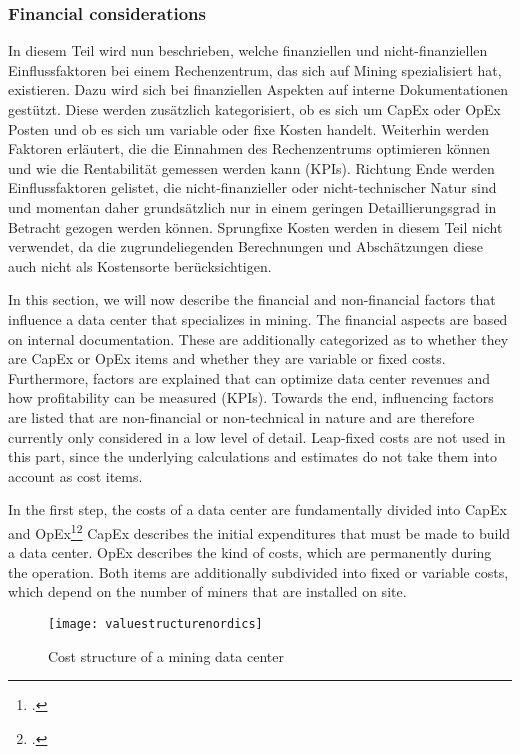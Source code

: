 \subsubsection{Financial considerations} \label{toc:kennzahlenundeinflussfaktoren}

In diesem Teil wird nun beschrieben, welche finanziellen und nicht-finanziellen Einflussfaktoren bei einem
Rechenzentrum, das sich auf Mining spezialisiert hat, existieren. Dazu wird sich bei finanziellen Aspekten auf interne
Dokumentationen gestützt. Diese werden zusätzlich kategorisiert, ob es sich um \ac{CapEx} oder \ac{OpEx} Posten und
ob es sich um variable oder fixe Kosten handelt. Weiterhin werden Faktoren erläutert, die die Einnahmen des Rechenzentrums
optimieren können und wie die Rentabilität gemessen werden kann (\acp{KPI}). Richtung Ende werden Einflussfaktoren
gelistet, die nicht-finanzieller oder nicht-technischer Natur sind und momentan daher grundsätzlich nur in einem geringen
Detaillierungsgrad in Betracht gezogen werden können. Sprungfixe Kosten werden in diesem Teil nicht verwendet, da die
zugrundeliegenden Berechnungen und Abschätzungen diese auch nicht als Kostensorte berücksichtigen.

In this section, we will now describe the financial and non-financial factors that influence a data center that specializes in mining.
The financial aspects are based on internal documentation.
These are additionally categorized as to whether they are \ac{CapEx} or \ac{OpEx} items and
whether they are variable or fixed costs. Furthermore, factors are explained that can optimize data center revenues
and how profitability can be measured (\acp{KPI}). Towards the end, influencing factors are
listed that are non-financial or non-technical in nature and are therefore currently only considered in a low level of detail.
Leap-fixed costs are not used in this part, since the
underlying calculations and estimates do not take them into account as cost items.

In the first step, the costs of a data center are fundamentally divided into \ac{CapEx} and \ac{OpEx}\footcite[Cf.][]{appendix:capex}\footcite[Cf.][]{appendix:opex} \ac{CapEx}
describes the initial
expenditures that must be made to build a data center. \ac{OpEx} describes the kind of costs, which are permanently
during the operation. Both items are additionally subdivided into fixed or variable costs, which depend on the number of miners
that are installed on site.

\begin{figure}[H]
    \caption{Cost structure of a mining data center}
    \texttt{[image: valuestructurenordics]}
    \label{figure:valuestructurenordics}
\end{figure}

